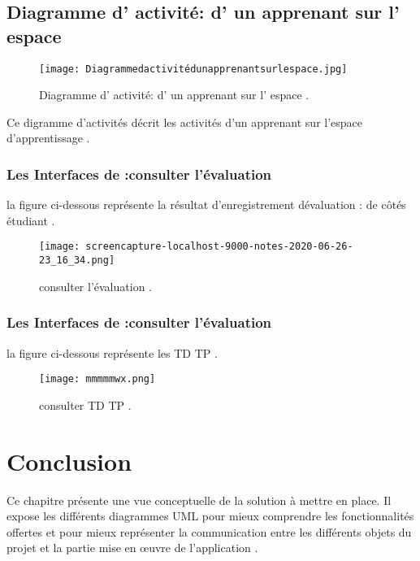 \clearpage


\subsection{Diagramme d' activité: d' un apprenant sur l' espace}


\begin{figure}[ht]
	\centering
	\texttt{[image: Diagrammedactivitédunapprenantsurlespace.jpg]}
	\caption{Diagramme d' activité: d' un apprenant sur l' espace .}
	\label{fig:Diagramme d' activité: d' un apprenant sur l' espace }
\end{figure}
\FloatBarrier

Ce digramme d’activités décrit les activités d’un apprenant  sur l'espace d'apprentissage .
\subsubsection{Les Interfaces de :consulter l'évaluation  }

la figure ci-dessous représente la résultat  d'enregistrement dévaluation : de côtés  étudiant .
\begin{figure}[ht]
	\centering
	\texttt{[image: screencapture-localhost-9000-notes-2020-06-26-23\_16\_34.png]}
	\caption{consulter l'évaluation .}
	\label{fig:consulter l'évaluation }
\end{figure}
\FloatBarrier
\subsubsection{Les Interfaces de :consulter l'évaluation  }

la figure ci-dessous représente les TD TP .
\begin{figure}[ht]
	\centering
	\texttt{[image: mmmmmwx.png]}
	\caption{consulter TD TP .}
	\label{fig:consulter TD TP }
\end{figure}
\FloatBarrier


\section{Conclusion}

Ce chapitre présente une vue conceptuelle de la solution à mettre en place. Il expose les différents diagrammes UML pour mieux comprendre les fonctionnalités offertes et pour mieux représenter la communication entre les différents objets du projet et la partie mise en œuvre de l’application .


